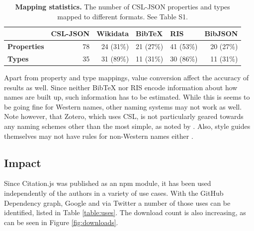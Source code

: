 \documentclass[fleqn,10pt,lineno]{wlpeerj} %
\begin{document}
\begin{table}[bt]
\caption{\textbf{Mapping statistics.} The number of CSL-JSON properties and types mapped to different formats. See Table S1. }
\label{table:completeness}
\begin{tabular}{l|r|r|r|r|r|}
\cline{2-6}
                                          & \multicolumn{1}{l|}{\textbf{CSL-JSON}} & \multicolumn{1}{l|}{\textbf{Wikidata}} & \multicolumn{1}{l|}{\textbf{BibTeX}} & \multicolumn{1}{l|}{\textbf{RIS}} & \multicolumn{1}{l|}{\textbf{BibJSON}} \\ \hline
\multicolumn{1}{|l|}{\textbf{Properties}} & 78                                     & 24 (31\%)                              & 21 (27\%)                            & 41 (53\%)                         & 20 (27\%)                             \\ \hline
\multicolumn{1}{|l|}{\textbf{Types}}      & 35                                     & 31 (89\%)                              & 11 (31\%)                            & 30 (86\%)                         & 11 (31\%)                             \\ \hline
\end{tabular}
\end{table}

Apart from property and type mappings, value conversion affect the accuracy of results as well. Since neither BibTeX nor RIS encode information about how names are built up, such information has to be estimated. While this is seems to be going fine for Western names, other naming systems may not work as well. Note however, that Zotero, which uses CSL, is not particularly geared towards any naming schemes other than the most simple, as noted by 
\cite{darcus_non-western_2008}. Also, style guides themselves may not have rules for non-Western names either \citep{qiu_scientific_2008,puniamoorthy_give_2008}.

\subsection*{Impact}

Since Citation.js was published as an npm module, it has been used independently of the authors in a variety of use cases. With the GitHub Dependency graph, Google and via Twitter a number of those uses can be identified, listed in Table \ref{table:uses}. The download count is also increasing, as can be seen in Figure \ref{fig:downloads}.
\end{document}
